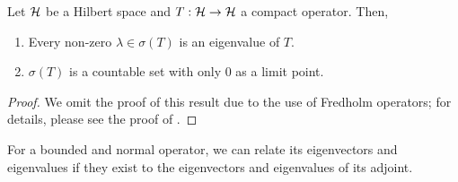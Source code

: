 \begin{theorem} \label{lbl_thrm_riesz_schauder}
  Let $\mathcal{H}$ be a Hilbert space and $T: \mathcal{H} \to \mathcal{H}$ a compact operator. Then,

  \begin{enumerate}[label = (\alph*)]
  \item Every non-zero $\lambda \in \sigma(T)$ is an eigenvalue of $T$.
  \item $\sigma(T)$ is a countable set with only $0$ as a limit point.
  \end{enumerate}
\end{theorem}
\begin{proof}
  We omit the proof of this result due to the use of Fredholm operators; for details, please see the proof of {\cite[Theorem 14.18]{muscat}}.
\end{proof}

For a bounded and normal operator, we can relate its eigenvectors and eigenvalues if they exist to the eigenvectors and eigenvalues of its adjoint.

